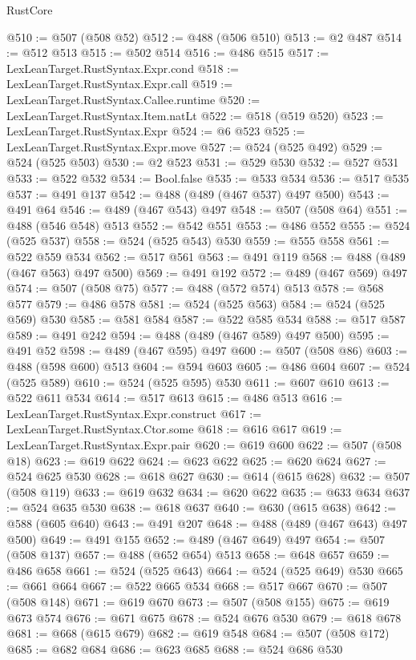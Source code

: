 \begin{lexlean}{RustCore}
\begin{coremodule}
@510 := @507 (@508 @52)
@512 := @488 (@506 @510)
@513 := @2 @487
@514 := @512 @513
@515 := @502 @514
@516 := @486 @515
@517 := LexLeanTarget.RustSyntax.Expr.cond
@518 := LexLeanTarget.RustSyntax.Expr.call
@519 := LexLeanTarget.RustSyntax.Callee.runtime
@520 := LexLeanTarget.RustSyntax.Item.natLt
@522 := @518 (@519 @520)
@523 := LexLeanTarget.RustSyntax.Expr
@524 := @6 @523
@525 := LexLeanTarget.RustSyntax.Expr.move
@527 := @524 (@525 @492)
@529 := @524 (@525 @503)
@530 := @2 @523
@531 := @529 @530
@532 := @527 @531
@533 := @522 @532
@534 := Bool.false
@535 := @533 @534
@536 := @517 @535
@537 := @491 @137
@542 := @488 (@489 (@467 @537) @497 @500)
@543 := @491 @64
@546 := @489 (@467 @543) @497
@548 := @507 (@508 @64)
@551 := @488 (@546 @548) @513
@552 := @542 @551
@553 := @486 @552
@555 := @524 (@525 @537)
@558 := @524 (@525 @543) @530
@559 := @555 @558
@561 := @522 @559 @534
@562 := @517 @561
@563 := @491 @119
@568 := @488 (@489 (@467 @563) @497 @500)
@569 := @491 @192
@572 := @489 (@467 @569) @497
@574 := @507 (@508 @75)
@577 := @488 (@572 @574) @513
@578 := @568 @577
@579 := @486 @578
@581 := @524 (@525 @563)
@584 := @524 (@525 @569) @530
@585 := @581 @584
@587 := @522 @585 @534
@588 := @517 @587
@589 := @491 @242
@594 := @488 (@489 (@467 @589) @497 @500)
@595 := @491 @52
@598 := @489 (@467 @595) @497
@600 := @507 (@508 @86)
@603 := @488 (@598 @600) @513
@604 := @594 @603
@605 := @486 @604
@607 := @524 (@525 @589)
@610 := @524 (@525 @595) @530
@611 := @607 @610
@613 := @522 @611 @534
@614 := @517 @613
@615 := @486 @513
@616 := LexLeanTarget.RustSyntax.Expr.construct
@617 := LexLeanTarget.RustSyntax.Ctor.some
@618 := @616 @617
@619 := LexLeanTarget.RustSyntax.Expr.pair
@620 := @619 @600
@622 := @507 (@508 @18)
@623 := @619 @622
@624 := @623 @622
@625 := @620 @624
@627 := @524 @625 @530
@628 := @618 @627
@630 := @614 (@615 @628)
@632 := @507 (@508 @119)
@633 := @619 @632
@634 := @620 @622
@635 := @633 @634
@637 := @524 @635 @530
@638 := @618 @637
@640 := @630 (@615 @638)
@642 := @588 (@605 @640)
@643 := @491 @207
@648 := @488 (@489 (@467 @643) @497 @500)
@649 := @491 @155
@652 := @489 (@467 @649) @497
@654 := @507 (@508 @137)
@657 := @488 (@652 @654) @513
@658 := @648 @657
@659 := @486 @658
@661 := @524 (@525 @643)
@664 := @524 (@525 @649) @530
@665 := @661 @664
@667 := @522 @665 @534
@668 := @517 @667
@670 := @507 (@508 @148)
@671 := @619 @670
@673 := @507 (@508 @155)
@675 := @619 @673 @574
@676 := @671 @675
@678 := @524 @676 @530
@679 := @618 @678
@681 := @668 (@615 @679)
@682 := @619 @548
@684 := @507 (@508 @172)
@685 := @682 @684
@686 := @623 @685
@688 := @524 @686 @530

\end{coremodule}
\end{lexlean}
